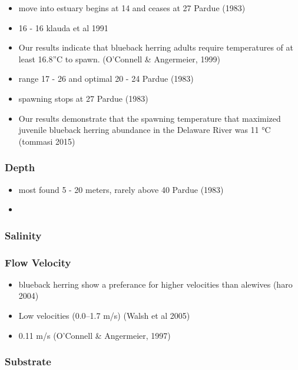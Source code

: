 \documentclass[
]{book}
\providecommand{\tightlist}{%
  \setlength{\itemsep}{0pt}\setlength{\parskip}{0pt}}
\begin{document}
\begin{itemize}
\item
  move into estuary begins at 14 and ceases at 27 Pardue (1983)
\item
  16 - 16 klauda et al 1991
\item
  Our results indicate that blueback herring adults require temperatures of at least 16.8''C to spawn. (O'Connell \& Angermeier, 1999)
\item
  range 17 - 26 and optimal 20 - 24 Pardue (1983)
\item
  spawning stops at 27 Pardue (1983)
\item
  Our results demonstrate that the spawning temperature that maximized juvenile blueback herring abundance in the Delaware River was 11 °C (tommasi 2015)
\end{itemize}

\hypertarget{depth-6}{%
\subsubsection{Depth}\label{depth-6}}

\begin{itemize}
\item
  most found 5 - 20 meters, rarely above 40 Pardue (1983)
\item
\end{itemize}

\hypertarget{salinity-6}{%
\subsubsection{Salinity}\label{salinity-6}}

\hypertarget{flow-velocity-6}{%
\subsubsection{Flow Velocity}\label{flow-velocity-6}}

\begin{itemize}
\tightlist
\item
  blueback herring show a preferance for higher velocities than alewives (haro 2004)
\item
  Low velocities (0.0--1.7 m/s) (Walsh et al 2005)
\item
  0.11 m/s (O'Connell \& Angermeier, 1997)
\end{itemize}

\hypertarget{substrate-6}{%
\subsubsection{Substrate}\label{substrate-6}}
\end{document}
